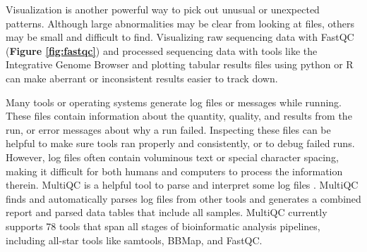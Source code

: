 \documentclass[10pt,letterpaper]{article}
\begin{document}
Visualization is another powerful way to pick out unusual or unexpected patterns. 
Although large abnormalities may be clear from looking at files, others may be small and difficult to find. 
Visualizing raw sequencing data with FastQC (\textbf{Figure \ref{fig:fastqc}}) and processed sequencing data with tools like the Integrative Genome Browser and plotting tabular results files using python or R can make aberrant or inconsistent results easier to track down.

Many tools or operating systems generate log files or messages while running. 
These files contain information about the quantity, quality, and results from the run, or error messages about why a run failed. 
Inspecting these files can be helpful to make sure tools ran properly and consistently, or to debug failed runs. 
However, log files often contain voluminous text or special character spacing, making it difficult for both humans and computers to process the information therein. 
MultiQC is a helpful tool to parse and interpret some log files \cite{ewels2016}. 
MultiQC finds and automatically parses log files from other tools and generates a combined report and parsed data tables that include all samples. 
MultiQC currently supports 78 tools that span all stages of bioinformatic analysis pipelines, including all-star tools like samtools, BBMap, and FastQC. 

\begin{table}
\caption{\label{tab:bash_commands} Some bash commands are useful to quickly explore the contents of a file. By using these commands, the user can detect common formatting problems or other abnormalities.}
\end{table}
\end{document}
